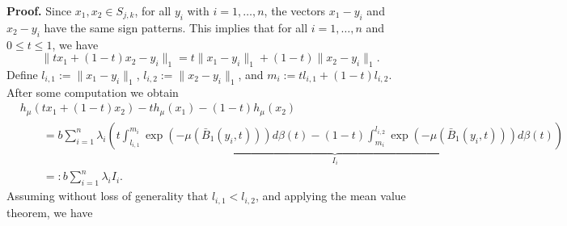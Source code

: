 \documentclass[10pt,a4paper]{amsart}
\renewenvironment{proof}[1]{\par\medskip\noindent\textbf{#1}\enspace\ignorespaces}{\par\medskip}
\newcommand{\death}{{\beta}}
\begin{document}
\begin{proof}{Proof.} 
Since \( x_1, x_2 \in S_{j,k} \), for all \( y_i \) with \( i=1,\dots,n \), the vectors \( x_1 - y_i \) and \( x_2 - y_i \) have the same sign patterns. This implies that for all \( i=1,\dots,n \) and \( 0 \leq t \leq 1 \), we have
\[
\| t x_1 + (1 - t) x_2 - y_i \|_1 = t \| x_1 - y_i \|_1 + (1 - t) \| x_2 - y_i \|_1.
\]
Define $l_{i,1} := \| x_1 - y_i \|_1$, $l_{i,2} := \| x_2 - y_i \|_1$, and $m_i := t l_{i,1} + (1 - t) l_{i,2}$. After some computation we obtain
\begin{align*}
    &h_{\mu}(t x_1 + (1 - t) x_2) - t h_{\mu}(x_1) - (1 - t) h_{\mu}(x_2) \\
    &\qquad = b\sum_{i=1}^{n} \lambda_i \underbrace{\left( t\int_{l_{i,1}}^{m_i} \exp(-\mu(\bar{B}_1(y_i,t))) d\death(t)  - (1 - t) \int_{m_i}^{l_{i,2}} \exp(-\mu(\bar{B}_1(y_i,t))) d\death(t) \right)}_{I_i} \\ & \qquad=: b\sum_{i=1}^{n} \lambda_i I_i.
\end{align*}
Assuming without loss of generality that \( l_{i,1} < l_{i,2} \), and applying the mean value theorem, we have

\end{proof}
\end{document}
